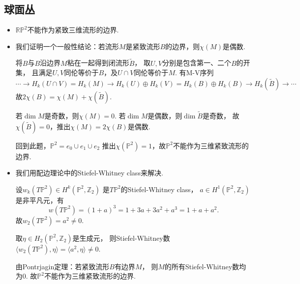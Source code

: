 \subsection{球面丛}
\begin{itemize}
    \item[5.] $\mathbb{R}\mathbb{P}^2$不能作为紧致三维流形的边界.
    \item[\textbf{证明一}] 
        \qquad 我们证明一个一般性结论：若流形$M$是紧致流形$B$的边界，则$\chi(M)$是偶数.\par
        \qquad 将$B$与$B$沿边界$M$粘在一起得到闭流形$\tilde{B}$，
        取$U, V$分别是包含第一、二个$B$的开集，
        且满足$U,V$同伦等价于$B$，及$U\cap V$同伦等价于$M$. 有M-V序列
            $$\cdots \rightarrow H_k(U\cap V)=H_k(M)
            \rightarrow H_k(U)\oplus H_k(V)=H_k(B)\oplus H_k(B)
            \rightarrow H_k(\tilde{B})\rightarrow \cdots$$
    故$2\chi(B)=\chi(M)+\chi(\tilde{B})$.\par
        \qquad 若$\dim M$是奇数，则$\chi(M)=0$. 
        若$\dim M$是偶数，则$\dim \tilde{B}$是奇数，
        故$\chi(\tilde{B})=0$，推出$\chi(M)=2\chi(B)$是偶数.\par
        \qquad 回到此题，$\mathbb{P}^2=e_0\cup e_1\cup e_2$
        推出$\chi(\mathbb{P}^2)=1$，故$\mathbb{P}^2$不能作为三维紧致流形的边界.
    
    \item[\textbf{证明二}]
        \qquad 我们用配边理论中的Stiefel-Whitney class来解决.\par
        \qquad 设$w_k(T\mathbb{P}^2)\in H^k(\mathbb{P}^2,\mathbb{Z}_2)$
        是$T\mathbb{P}^2$的Stiefel-Whitney class，
        $a\in H^1(\mathbb{P}^2,\mathbb{Z}_2)$是非平凡元，有
            $$w(T\mathbb{P}^2)=(1+a)^3=1+3a+3a^2+a^3=1+a+a^2.$$
        故$w_2(T\mathbb{P}^2)=a^2\neq 0$.\par
        \qquad 取$\eta\in H_2(\mathbb{P}^2,\mathbb{Z}_2)$是生成元，
        则Stiefel-Whitney数$\langle w_2(T\mathbb{P}^2),\eta\rangle=\langle a^2,\eta\rangle \neq 0.$\par
        \qquad 由Pontrjagin定理：若紧致流形$B$有边界$M$，
        则$M$的所有Stiefel-Whitney数均为$0$. 故$\mathbb{P}^2$不能作为三维紧致流形的边界.
\end{itemize}



